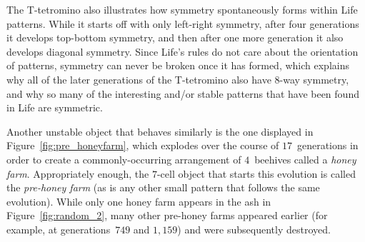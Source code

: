 The T-tetromino also illustrates how symmetry spontaneously forms within Life patterns. While it starts off with only left-right symmetry, after four generations it develops top-bottom symmetry, and then after one more generation it also develops diagonal symmetry. Since Life's rules do not care about the orientation of patterns, symmetry can never be broken once it has formed, which explains why all of the later generations of the T-tetromino also have $8$-way symmetry, and why so many of the interesting and/or stable patterns that have been found in Life are symmetric.

Another unstable object that behaves similarly is the one displayed in Figure~\ref{fig:pre_honeyfarm}, which explodes over the course of $17$~generations in order to create a commonly-occurring arrangement of $4$~beehives called a \emph{honey farm}. Appropriately enough, the $7$-cell object that starts this evolution is called the \emph{pre-honey farm} (as is any other small pattern that follows the same evolution). While only one honey farm appears in the ash in Figure~\ref{fig:random_2}, many other pre-honey farms appeared earlier (for example, at generations~$749$ and $1,159$) and were subsequently destroyed.

